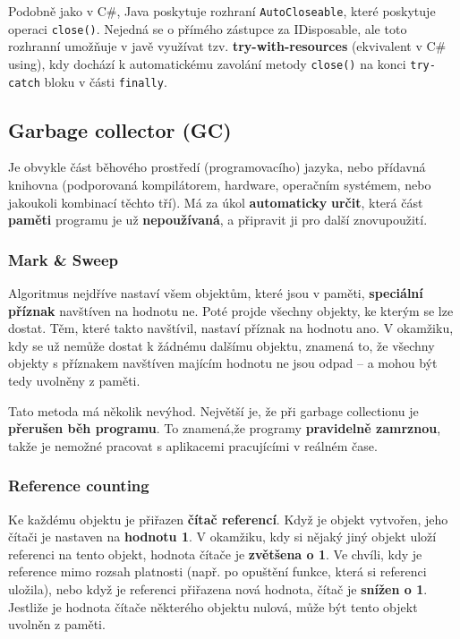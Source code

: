 Podobně jako v C\#, Java poskytuje rozhraní \texttt{AutoCloseable}, které poskytuje operaci \texttt{close()}. Nejedná se o přímého zástupce za IDisposable, ale toto rozhranní umožňuje v javě využívat tzv. \textbf{try-with-resources} (ekvivalent v C\# using), kdy dochází k automatickému zavolání metody \texttt{close()} na konci \texttt{try-catch} bloku v části \texttt{finally}.

\subsection{Garbage collector (GC)}
Je obvykle část běhového prostředí (programovacího) jazyka, nebo přídavná knihovna (podporovaná kompilátorem, hardware, operačním systémem, nebo jakoukoli kombinací těchto tří). Má za úkol \textbf{automaticky} \textbf{určit}, která část \textbf{paměti} programu je už \textbf{nepoužívaná}, a připravit ji pro další znovupoužití.

\subsubsection{Mark \& Sweep}
Algoritmus nejdříve nastaví všem objektům, které jsou v paměti, \textbf{speciální příznak} navštíven na hodnotu ne. Poté projde všechny objekty, ke kterým se lze dostat. Těm, které takto navštívil, nastaví příznak na hodnotu ano. V okamžiku, kdy se už nemůže dostat k žádnému dalšímu objektu, znamená to, že všechny objekty s příznakem navštíven majícím hodnotu ne jsou odpad -- a mohou být tedy uvolněny z paměti.

Tato metoda má několik nevýhod. Největší je, že při garbage collectionu je \textbf{přerušen běh programu}. To znamená,že programy \textbf{pravidelně zamrznou}, takže je nemožné pracovat s aplikacemi pracujícími v reálném čase.

\subsubsection{Reference counting}
Ke každému objektu je přiřazen \textbf{čítač referencí}. Když je objekt vytvořen, jeho čítači je nastaven na \textbf{hodnotu 1}. V okamžiku, kdy si nějaký jiný objekt uloží referenci na tento objekt, hodnota čítače je \textbf{zvětšena o 1}. Ve chvíli, kdy je reference mimo rozsah platnosti (např. po opuštění funkce, která si referenci uložila), nebo když je referenci přiřazena nová hodnota, čítač je \textbf{snížen o 1}. Jestliže je hodnota čítače některého objektu nulová, může být tento objekt uvolněn z paměti.

